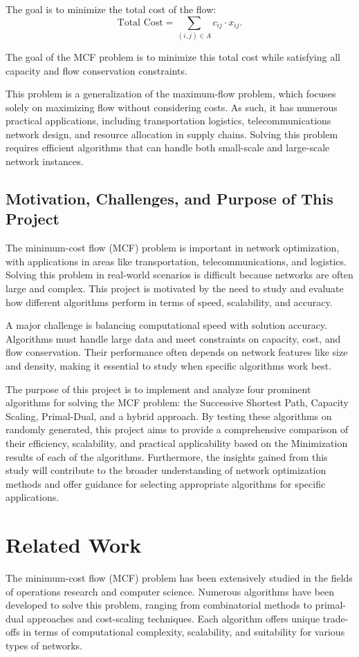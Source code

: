 \documentclass{article}
\begin{document}
The goal is to minimize the total cost of the flow:
\[
\text{Total Cost} = \sum_{(i,j) \in A} c_{ij} \cdot x_{ij}.
\]


The goal of the MCF problem is to minimize this total cost while satisfying all capacity and flow conservation constraints.~\cite{kovacs2015minimum}

This problem is a generalization of the maximum-flow problem, which focuses solely on maximizing flow without considering costs. As such, it has numerous practical applications, including transportation logistics, telecommunications network design, and resource allocation in supply chains. Solving this problem requires efficient algorithms that can handle both small-scale and large-scale network instances.

\subsection{Motivation, Challenges, and Purpose of This Project}
The minimum-cost flow (MCF) problem is important in network optimization, with applications in areas like transportation, telecommunications, and logistics. Solving this problem in real-world scenarios is difficult because networks are often large and complex. This project is motivated by the need to study and evaluate how different algorithms perform in terms of speed, scalability, and accuracy.

A major challenge is balancing computational speed with solution accuracy. Algorithms must handle large data and meet constraints on capacity, cost, and flow conservation. Their performance often depends on network features like size and density, making it essential to study when specific algorithms work best.

The purpose of this project is to implement and analyze four prominent algorithms for solving the MCF problem: the Successive Shortest Path, Capacity Scaling, Primal-Dual, and a hybrid approach. By testing these algorithms on randomly generated, this project aims to provide a comprehensive comparison of their efficiency, scalability, and practical applicability based on the Minimization results of each of the algorithms. Furthermore, the insights gained from this study will contribute to the broader understanding of network optimization methods and offer guidance for selecting appropriate algorithms for specific applications.



\section{Related Work}
The minimum-cost flow (MCF) problem has been extensively studied in the fields of operations research and computer science. Numerous algorithms have been developed to solve this problem, ranging from combinatorial methods to primal-dual approaches and cost-scaling techniques. Each algorithm offers unique trade-offs in terms of computational complexity, scalability, and suitability for various types of networks.
\end{document}
